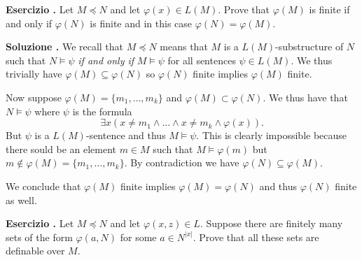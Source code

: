 \documentclass[10pt]{article}
\def\phi{\varphi}
\newcounter{ex}
\newenvironment{exercise}{\clearpage\addtocounter{ex}{1}\textbf{Esercizio \theex.\quad}}{}
\newcounter{sol}
\newenvironment{solution}{\addtocounter{sol}{1}\textbf{Soluzione \theex.\quad}}{}
\begin{document}
\begin{exercise}
  Let $M\preceq N$ and let $\phi(x)\in L(M)$.
  Prove that $\phi(M)$ is finite if and only if $\phi(N)$ is finite and in this case $\phi(N)=\phi(M)$.
\end{exercise}

\begin{solution}
  We recall that \(M\preceq N\) means that \(M\) is a \(L(M)\)-substructure of \(N\) such that  \(N\models\psi\) \textit{if and only if} \(M\models \psi\) for all sentences \(\psi\in L(M)\).
  We thus trivially have \(\phi(M)\subseteq\phi(N)\) so \(\phi(N)\) finite implies \(\phi(M)\) finite.

  Now suppose \(\phi(M) = \big\{m_1,\ldots, m_k\big\}\) and \(\phi(M)\subset\phi(N)\).
  We thus have that \(N\models\psi\) where \(\psi\) is the formula
  \[\exists x(x\neq m_1 \land\ldots\land x\neq m_k\land \phi(x)).\]
  But \(\psi\) is a \(L(M)\)-sentence and thus \(M\models\psi\).
  This is clearly impossible because there sould be an element \(m\in M\) such that \(M\models\phi(m)\) but \(m\not\in\phi(M) = \big\{m_1,\ldots,m_k\big\}\).
  By contradiction we have \(\phi(N)\subseteq\phi(M)\).

  We conclude that \(\phi(M)\) finite implies \(\phi(M) = \phi(N)\) and thus \(\phi(N)\) finite as well.
\end{solution}

\begin{exercise}
  Let $M\preceq N$ and let $\phi(x,z)\in L$.
  Suppose there are finitely many sets of the form $\phi(a,N)$ for some $a\in N^{|x|}$.
  Prove that all these sets are definable over $M$.
\end{exercise}
\end{document}
